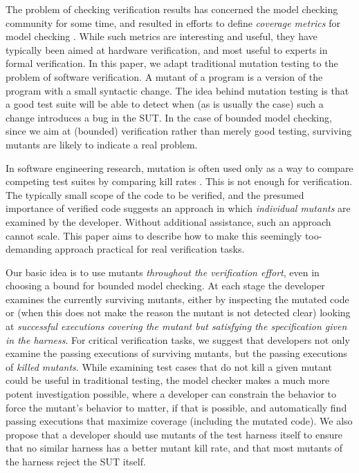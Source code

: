 \documentclass{svjour3}
\begin{document}
The problem of checking verification results has concerned the model checking community for some time, and resulted in efforts to define \emph{coverage
  metrics} for model checking \cite{Hoskote,PracticalCov}.  While such metrics are interesting and
useful, they have typically been aimed at hardware
verification, and most useful to experts in
formal verification.  In this paper, we adapt traditional mutation
testing \cite{mutation1,mutation2} to the problem of software
verification.  A mutant of a program is a version of the program with
a small syntactic change.  The idea behind mutation testing
is that a good test suite will be able to detect when (as is usually
the case) such a change introduces a bug in the SUT.  In the case of
bounded model checking, since we aim at (bounded) verification rather
than merely good testing, surviving mutants are
likely to indicate a real problem.

In software engineering research, mutation is often used only as a way
to compare competing test suites by comparing kill rates \cite{ISSTA13,TOSEM14}.  This is
not enough for verification.  The typically small scope of the code to
be verified, and the presumed importance of verified code
suggests an approach in which \emph{individual mutants}
are examined by the developer.  Without additional assistance, such an
approach cannot scale.  This paper aims to describe how to make this
seemingly too-demanding approach practical for real verification
tasks.


Our basic idea is to use mutants \emph{throughout the verification
  effort}, even in choosing a bound for bounded model checking.  At
each stage the developer examines the currently surviving mutants,
either by inspecting the mutated code or (when this does not make the
reason the mutant is not detected clear) looking at \emph{successful
  executions covering the mutant but satisfying the specification
  given in the harness}.  For critical verification tasks, we suggest
that developers not only examine the passing executions of surviving
mutants, but the passing executions of \emph{killed mutants}.  While
examining test cases that do not kill a given mutant could be useful
in traditional testing, the model checker makes a much more potent
investigation possible, where a developer can constrain the behavior
to force the mutant's behavior to matter, if that is possible, and
automatically find passing executions that maximize coverage
(including the mutated code).  We also propose that a developer should
use mutants of the test harness itself to ensure that no similar
harness has a better mutant kill rate, and that most mutants of the
harness reject the SUT itself.
\end{document}

